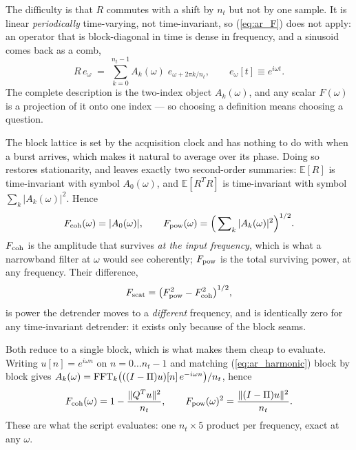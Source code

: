 \documentclass{article}
\numberwithin{equation}{section}   %
\begin{document}
The difficulty is that $R$ commutes with a shift by $n_t$ but not by one sample.  It is linear
{\em periodically} time-varying, not time-invariant, so (\ref{eq:ar_F}) does not apply: an operator that is
block-diagonal in time is dense in frequency, and a sinusoid comes back as a comb,
\begin{equation}
R\,e_\omega \;=\; \sum_{k=0}^{n_t-1} A_k(\omega)\; e_{\omega + 2\pi k/n_t},
\qquad e_\omega[t] \equiv e^{i\omega t} .
\label{eq:ar_harmonic}
\end{equation}
The complete description is the two-index object $A_k(\omega)$, and any scalar $F(\omega)$ is a projection of
it onto one index --- so choosing a definition means choosing a question.

The block lattice is set by the acquisition clock and has nothing to do with when a burst arrives, which
makes it natural to average over its phase.  Doing so restores stationarity, and leaves exactly two
second-order summaries: $\mathbb{E}[R]$ is time-invariant with symbol $A_0(\omega)$, and $\mathbb{E}[R^TR]$
is time-invariant with symbol $\sum_k |A_k(\omega)|^2$.  Hence
\begin{equation}
F_{\rm coh}(\omega) = |A_0(\omega)| ,
\qquad
F_{\rm pow}(\omega) = \Big(\sum\nolimits_k |A_k(\omega)|^2\Big)^{1/2} .
\label{eq:ar_twoF}
\end{equation}
$F_{\rm coh}$ is the amplitude that survives {\em at the input frequency}, which is what a narrowband filter
at $\omega$ would see coherently; $F_{\rm pow}$ is the total surviving power, at any frequency.  Their
difference,
\begin{equation}
F_{\rm scat} = \big(F_{\rm pow}^2 - F_{\rm coh}^2\big)^{1/2} ,
\end{equation}
is power the detrender moves to a {\em different} frequency, and is identically zero for any time-invariant
detrender: it exists only because of the block seams.

Both reduce to a single block, which is what makes them cheap to evaluate.  Writing $u[n] = e^{i\omega n}$
on $n = 0 \ldots n_t - 1$ and matching (\ref{eq:ar_harmonic}) block by block gives
$A_k(\omega) = {\rm FFT}_k\big( ((I-\Pi)u)[n]\,e^{-i\omega n} \big)/n_t$, hence
\begin{equation}
F_{\rm coh}(\omega) = 1 - \frac{\|Q^Tu\|^2}{n_t} ,
\qquad
F_{\rm pow}(\omega)^2 = \frac{\|(I-\Pi)u\|^2}{n_t} .
\label{eq:ar_chime_eval}
\end{equation}
These are what the script evaluates: one $n_t \times 5$ product per frequency, exact at any $\omega$.
\end{document}
